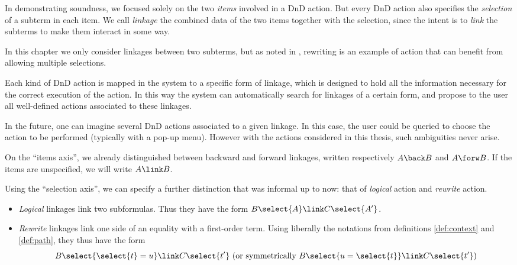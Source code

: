 In demonstrating soundness, we focused solely on the two \emph{items} involved
in a DnD action. But every DnD action also specifies the \emph{selection} of a
subterm in each item. We call \emph{linkage} the combined data of the two items
together with the selection, since the intent is to \emph{link} the subterms
to make them interact in some way.

\begin{remark}
In this chapter we only consider linkages between two subterms, but as noted in
, rewriting is an example of action that can benefit from
allowing multiple selections.
\end{remark}

Each kind of DnD action is mapped in the system to a specific form of linkage,
which is designed to hold all the information necessary for the correct
execution of the action. In this way the system can automatically search for
linkages of a certain form, and propose to the user all well-defined actions
associated to these linkages.

\begin{remark}
  In the future, one can imagine several DnD actions associated to a given
  linkage. In this case, the user could be queried to choose the action to be
  performed (typically with a pop-up menu). However with the actions considered
  in this thesis, such ambiguities never arise.
\end{remark}

On the ``items axis'', we already distinguished between backward and forward
linkages, written respectively $A \back B$ and $A \forw B$. If the items are
unspecified, we will write $A \link B$.

Using the ``selection axis'', we can specify a further distinction that was
informal up to now: that of \emph{logical} action and \emph{rewrite} action.
\begin{itemize}
  \item \emph{Logical} linkages link two subformulas. Thus they have the form
  $B\select{A} \link C\select{A'}$.
  \item \emph{Rewrite} linkages link one side of an equality with a first-order
  term. Using liberally the notations from definitions \ref{def:context} and
  \ref{def:path}, they thus have the form
  $$B\select{\select{t} = u} \link C
  \select{t'} \text{\ (or symmetrically $B\select{u = \select{t}} \link C
  \select{t'}$)}$$
\end{itemize}

